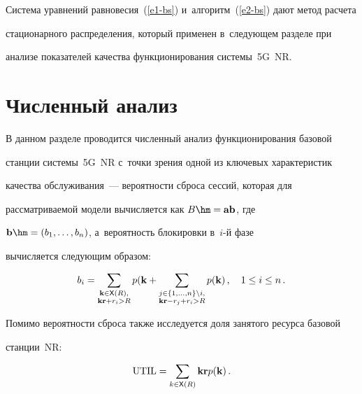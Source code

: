   


  Система уравнений равновесия~(\ref{e1-bs}) и~алгоритм~(\ref{e2-bs}) дают метод расчета 


стационарного распределения, который применен в~следующем разделе при 


анализе показателей качества функционирования системы~5G~NR.





\section{Численный анализ}


  


  В данном разделе проводится численный анализ функционирования базовой 


станции системы~5G~NR с~точки зрения одной из ключевых характеристик 


качества обслуживания~--- вероятности сброса сессий, которая для 


рассматриваемой модели вычисляется как $B\hm= \mathbf{ab}$, где 


$\mathbf{b}\hm=(b_1,\ldots , b_n)$, а~вероятность блокировки в~$i$-й фазе 


вычисляется следующим образом:


  \begin{equation*}


  b_i=\sum\limits_{\substack{{\mathbf{k}\in {\sf X}(R),}\\ 


  {\mathbf{kr}+r_i>R}}} 


p(\mathbf{k}+\sum\limits_{\substack{{j\in \{1,\ldots , n\}\backslash i,}\\


{ \mathbf{kr}-r_j+r_i 


>R}}}  p(\mathbf{k})\,,\quad 1\leq i\leq n\,.




  \end{equation*}


Помимо вероятности сброса также исследуется доля занятого ресурса базовой 


станции~NR:


\begin{equation*}


\mathrm{UTIL}=\sum\limits_{k\in {\sf X}(R)} \mathbf{kr} p(\mathbf{k})\,.




\end{equation*}


